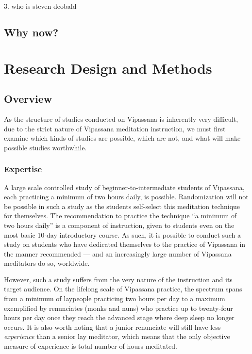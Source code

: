 \documentclass[a4paper, amsfonts, amssymb, amsmath, reprint, showkeys, nofootinbib, twoside]{revtex4-1}
\begin{document}
3. who is steven deobald

\subsection{Why now?}

\section{Research Design and Methods}

\subsection{Overview}

As the structure of studies conducted on Vipassana is inherently very difficult, due to
the strict nature of Vipassana meditation instruction, we must first examine which kinds of
studies are possible, which are not, and what will make possible studies worthwhile.

\subsubsection{Expertise}

A large scale controlled study of beginner-to-intermediate
students of Vipassana, each practicing a minimum of two hours daily, is
possible. Randomization will not be possible in such a study as the students
self-select this meditation technique for themselves. The recommendation to practice
the technique ``a minimum of two hours daily'' is a component of instruction, given
to students even on the most basic 10-day introductory
course. \cite{dhammaorg2017guidelines,goenka2001importance} As such, it is possible
to conduct such a study on students who have dedicated themselves to the practice of
Vipassana in the manner recommended --- and an increasingly large number of Vipassana
meditators do so, worldwide.

However, such a study suffers from the very nature of
the instruction and its target audience. On the lifelong scale of Vipassana
practice, the spectrum spans from a minimum of laypeople practicing two hours per day to
a maximum exemplified by renunciates (monks and nuns) who practice up to twenty-four
hours per day once they
reach the advanced stage where deep sleep no longer occurs. It is
also worth noting that a junior renunciate will still have less \textit{experience}
than a senior lay meditator, which means that the only objective measure of
experience is total number of hours meditated. \cite{goleman2017altered}
\end{document}

